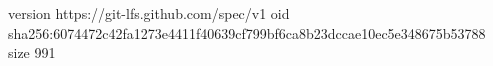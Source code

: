 version https://git-lfs.github.com/spec/v1
oid sha256:6074472c42fa1273e4411f40639cf799bf6ca8b23dccae10ec5e348675b53788
size 991
